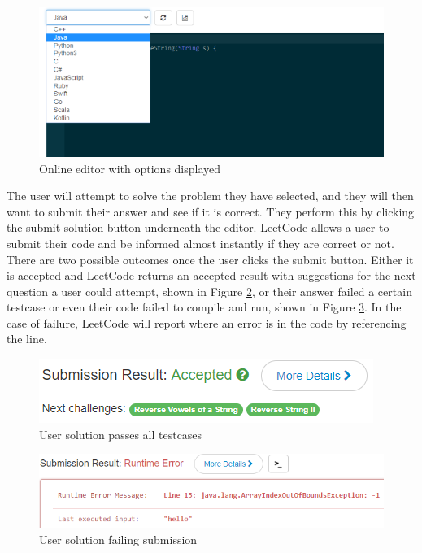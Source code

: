 \documentclass[10pt,twocolumn,hidelinks]{IEEEtran}
\begin{document}
\begin{figure}[h]
\includegraphics[scale=0.4]{languageUI.png}
\caption{Online editor with options displayed}
\label{fig:langUI}
\end{figure}   
The user will attempt to solve the problem they have selected, and they will then want to submit their answer and see if it is correct. They perform this by clicking the submit solution button underneath the editor. LeetCode allows a user to submit their code and be informed almost instantly if they are correct or not. There are two possible outcomes once the user clicks the submit button. Either it is accepted and LeetCode returns an accepted result with suggestions for the next question a user could attempt, shown in Figure \ref{fig:accepted}, or their answer failed a certain testcase or even their code failed to compile and run, shown in Figure \ref{fig:fail}. In the case of failure, LeetCode will report where an error is in the code by referencing the line.  
\begin{figure}[h]
\includegraphics[scale=0.4]{accepted.png}
\caption{User solution passes all testcases}
\label{fig:accepted}
\end{figure}  
\begin{figure}[h]
\includegraphics[scale=0.4]{failure.png}
\caption{User solution failing submission}
\label{fig:fail}
\end{figure}    
\end{document}
